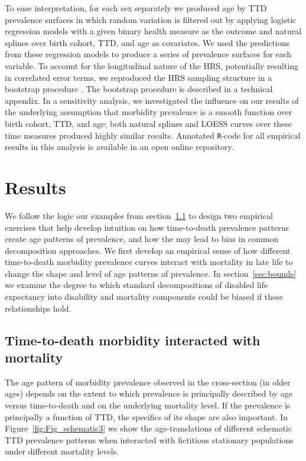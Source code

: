 \documentclass[12pt,oneside,a4paper]{article} %
\begin{document}
To ease interpretation, for each sex separately we produced age by TTD prevalence surfaces in which
random variation is filtered out by applying logistic regression models with a
given binary health measure as the outcome and natural splines over birth cohort,
TTD, and age as covariates. We used the predictions from these regression models
to produce a series of prevalence surfaces for each variable. To account for the
longitudinal nature of the HRS, potentially resulting in correlated error terms,
we reproduced the HRS sampling structure in a bootstrap procedure
\citep{efron1994introduction}. The bootstrap procedure is described in a technical appendix. In a sensitivity analysis, we investigated the influence on our results of the underlying assumption that morbidity prevalence is a smooth function over birth cohort, TTD, and age; both natural splines and LOESS curves over these time measures \citep{riffe2017ttd} produced highly similar results. Annotated \texttt{R}-code for all empirical results in this analysis is available in an open online repository.
% 

\section{Results}
\label{sec:ttdok}
We follow the logic our examples from section~\ref{sec:schematic} to design two empirical exercises that help develop intuition on how time-to-death prevalence patterns create age patterns of prevalence, and how the may lead to bias in common decomposition approaches. We first develop an empirical sense of how different time-to-death morbidity prevalence curves interact with mortality in late life to change the shape and level of age patterns of prevalence. In section~\ref{sec:bounds} we examine the degree to which standard decompositions of disabled life expectancy into disability and mortality components could be biased if these relationships hold.
\FloatBarrier
\subsection{Time-to-death morbidity interacted with mortality}
\label{sec:schematic}
The age pattern of morbidity prevalence observed in the cross-section (in older ages) depends
on the extent to which prevalence is principally described by
age versus time-to-death and on the underlying mortality
level. If the prevalence is principally a function of TTD, the
specifics of its shape are also important. In Figure~\ref{fig:Fig_schematic3} we
show the age-translations of different schematic TTD prevalence patterns when
interacted with fictitious stationary populations under different mortality levels.
\end{document}
